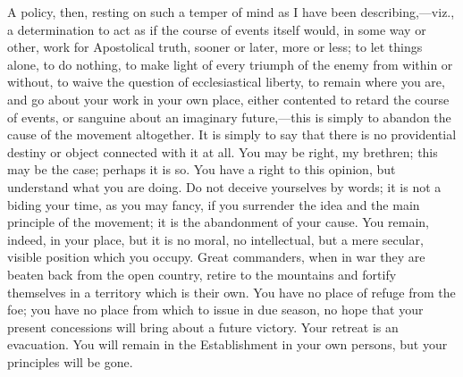 A policy, then, resting on such a temper of mind as I have been
describing,—viz., a determination to act as if the course of events
itself would, in some way or other, work for Apostolical truth, sooner
or later, more or less; to let things alone, to do nothing, to make
light of every triumph of the enemy from within or without, to waive
the question of ecclesiastical liberty, to remain where you are, and
go about your work in your own place, either contented to retard the
course of events, or sanguine about an imaginary future,—this is
simply to abandon the cause of the movement altogether. It is simply
to say that there is no providential destiny or object connected with
it at all. You may be right, my brethren; this may be the case;
perhaps it is so. You have a right to this opinion, but understand
what you are doing. Do not deceive yourselves by words; it is not a
biding your time, as you may fancy, if you surrender the idea and the
main principle of the movement; it is the abandonment of your cause.
You remain, indeed, in your place, but it is no moral, no
intellectual, but a mere secular, visible position which you occupy.
Great commanders, when in war they are beaten back from the open
country, retire to the mountains and fortify themselves in a territory
which is their own. You have no place of refuge from the foe; you have
no place from which to issue in due season, no hope that your present
concessions will bring about a future victory. Your retreat is an
evacuation. You will remain in the Establishment in your own persons,
but your principles will be gone.

